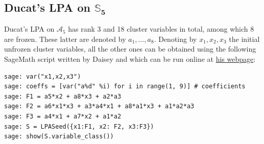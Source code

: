 \documentclass[11pt]{amsart}
\begin{document}




\subsection{\bf Ducat's LPA on $\boldsymbol{\mathbb S_5}$}
Ducat's LPA on $\mathcal A_5$ has rank 3 and 18 cluster variables in total, among which 8 are frozen. These latter are denoted by  $a_1,\ldots,a_8$. Denoting by $x_1,x_2,x_3$  the initial unfrozen cluster variables, all the other ones can be obtained using the following SageMath script written by Daisey and which can be run online at \href{https://oliverdaisey.github.io/code/}{his webpage}: 
\begin{lstlisting}
sage: var("x1,x2,x3")
sage: coeffs = [var("a%d" %i) for i in range(1, 9)] # coefficients
sage: F1 = a5*x2 + a8*x3 + a2*a3
sage: F2 = a6*x1*x3 + a3*a4*x1 + a8*a1*x3 + a1*a2*a3
sage: F3 = a4*x1 + a7*x2 + a1*a2
sage: S = LPASeed({x1:F1, x2: F2, x3:F3})
sage: show(S.variable_class())
\end{lstlisting}
\end{document}
